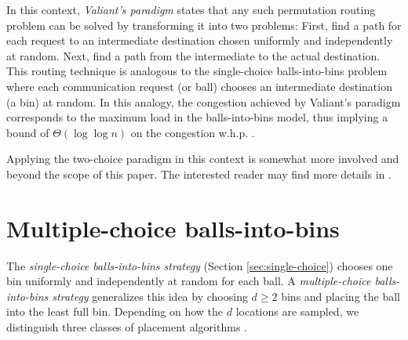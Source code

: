 \documentclass[a4paper,12pt]{article}
\begin{document}
In this context, \emph{Valiant's paradigm} \cite{V82} states that any such permutation routing problem can be solved by transforming it into two problems: First, find a path for each request to an intermediate destination chosen uniformly and independently at random. Next, find a path from the intermediate to the actual destination. This routing technique is analogous to the single-choice balls-into-bins problem where each communication request (or ball) chooses an intermediate destination (a bin) at random. In this analogy, the congestion achieved by Valiant's paradigm corresponds to the maximum load in the balls-into-bins model, thus implying a bound of $\Theta\left(\log \log n\right)$ on the congestion w.h.p. \cite{CMM+98} \cite{MRS01}. 

Applying the two-choice paradigm in this context is somewhat more involved and beyond the scope of this paper. The interested reader may find more details in \cite{CMM+98}.

\section{Multiple-choice balls-into-bins}
\label{sec:multiple-choice}
The \emph{single-choice balls-into-bins strategy} (Section \ref{sec:single-choice}) chooses one bin uniformly and independently at random for each ball. A \emph{multiple-choice balls-into-bins strategy} generalizes this idea by  choosing $d \geq 2$ bins and placing the ball into the least full bin. Depending on how the $d$ locations are sampled, we distinguish three classes of placement algorithms \cite{VOC03}. 
\end{document}
